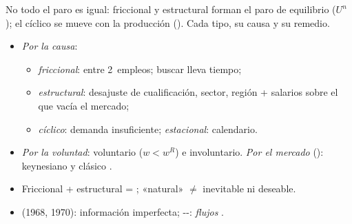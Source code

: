 \documentclass{article}
\begin{document}
\begin{columnas}
\begin{itemize}
\end{itemize}

\begin{ideaclave}
No todo el paro es igual: friccional y estructural forman el paro de equilibrio ($U^n$); el cíclico se mueve con la producción (). Cada tipo, su causa y su remedio.
\end{ideaclave}
\begin{itemize}
\item \emph{Por la causa}:
  \begin{itemize}
  \item \emph{friccional}: entre 2~empleos; buscar lleva tiempo;
  \item \emph{estructural}: desajuste de cualificación, sector, región + salarios sobre el que vacía el mercado;
  \item \emph{cíclico}: demanda insuficiente; \emph{estacional}: calendario.
  \end{itemize}
\item \emph{Por la voluntad}: voluntario ($w<w^R$) e involuntario. \emph{Por el mercado} (): keynesiano y clásico .
\item Friccional + estructural = ; «natural» $\neq$ inevitable ni deseable.
\end{itemize}
\begin{itemize}
\item {} (1968, 1970): información imperfecta; --: \emph{flujos} .

\end{itemize}
\end{columnas}
\end{document}
